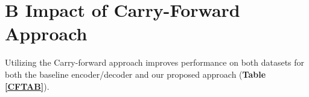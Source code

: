 \documentclass[letterpaper]{article}
\begin{document}
\section{B Impact of Carry-Forward Approach}

Utilizing the Carry-forward approach improves performance on both datasets for both the baseline encoder/decoder and our proposed approach (\textbf{Table \ref{CFTAB}}).


\begin{table}[htbp]
  \centering 



\setlength{\tabcolsep}{2pt}
\hspace*{-.0cm}

  \caption{Forecasting Error and SIV usage for both datasets, examining our primary baseline and proposed approach with and without our carry-forward approach. Outcomes are reported as: Error [95\% confidence interval] (SIV Usage). Both methods benefit from utilizing the carry-forward approach on both datasets. Confidence intervals were calculated from bootstraps with 1,000 resamples.}\label{CFTAB}
  
  \label{syn1} \label{CFTAB}
\end{table}
\end{document}
